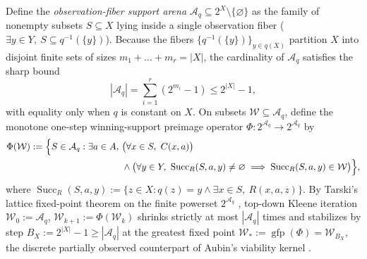 \documentclass[11pt,a4paper]{article}
\newcounter{none}
\begin{document}
Define the \emph{observation-fiber support arena}
\(\mathcal{A}_q \subseteq 2^X \setminus \{\varnothing\}\) as the family
of nonempty subsets \(S \subseteq X\) lying inside a single observation
fiber (\(\exists y \in Y,\ S \subseteq q^{-1}(\{y\})\)). Because the
fibers \(\{q^{-1}(\{y\})\}_{y \in q(X)}\) partition \(X\) into disjoint
finite sets of sizes \(m_1 + \dots + m_r = |X|\), the cardinality of
\(\mathcal{A}_q\) satisfies the sharp bound
\[|\mathcal{A}_q| = \sum_{i=1}^r (2^{m_i} - 1) \le 2^{|X|} - 1,\] with
equality only when \(q\) is constant on \(X\). On subsets
\(\mathcal{W} \subseteq \mathcal{A}_q\), define the monotone one-step
winning-support preimage operator
\(\Phi: 2^{\mathcal{A}_q} \to 2^{\mathcal{A}_q}\) by \[\begin{aligned}
\Phi(\mathcal{W}) := \Bigl\{S \in \mathcal{A}_q : \exists a \in A,\ &\bigl(\forall x \in S,\ C(x,a)\bigr) \\
&\land \bigl(\forall y \in Y,\ \operatorname{Succ}_R(S,a,y) \neq \varnothing \implies \operatorname{Succ}_R(S,a,y) \in \mathcal{W}\bigr)\Bigr\},
\end{aligned}\] where
\(\operatorname{Succ}_R(S,a,y) := \{z \in X : q(z) = y \land \exists x \in S,\ R(x,a,z)\}\).
By Tarski's lattice fixed-point theorem on the finite powerset
\(2^{\mathcal{A}_q}\) \citep{tarski1955, baierKatoen2008}, top-down
Kleene iteration \(\mathcal{W}_0 := \mathcal{A}_q\),
\(\mathcal{W}_{k+1} := \Phi(\mathcal{W}_k)\) shrinks strictly at most
\(|\mathcal{A}_q|\) times and stabilizes by step
\(B_X := 2^{|X|} - 1 \ge |\mathcal{A}_q|\) at the greatest fixed point
\(\mathcal{W}_* := \operatorname{gfp}(\Phi) = \mathcal{W}_{B_X}\), the
discrete partially observed counterpart of Aubin's viability kernel
\citep{aubinCellina1984, aubin1991}.
\end{document}
